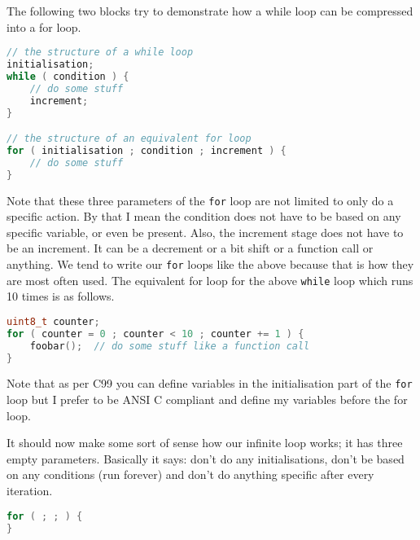 The following two blocks try to demonstrate how a while loop can be compressed into a for loop.

\begin{lstlisting}[language=c]
// the structure of a while loop
initialisation;
while ( condition ) {
    // do some stuff
    increment;
}

// the structure of an equivalent for loop
for ( initialisation ; condition ; increment ) {
    // do some stuff
}
\end{lstlisting}

Note that these three parameters of the \texttt{for} loop are not limited to only do a specific action. By that I mean the condition does not have to be based on any specific variable, or even be present. Also, the increment stage does not have to be an increment. It can be a decrement or a bit shift or a function call or anything.
We tend to write our \texttt{for} loops like the above because that is how they are most often used.
The equivalent for loop for the above \texttt{while} loop which runs 10 times is as follows.

\begin{lstlisting}[language=c]
uint8_t counter;
for ( counter = 0 ; counter < 10 ; counter += 1 ) {
    foobar();  // do some stuff like a function call
}
\end{lstlisting}

Note that as per C99 you can define variables in the initialisation part of the \texttt{for} loop but I prefer to be ANSI C compliant and define my variables before the for loop. 

It should now make some sort of sense how our infinite loop works; it has three empty parameters. Basically it says: don't do any initialisations, don't be based on any conditions (run forever) and don't do anything specific after every iteration. 

\begin{lstlisting}[language=c]
for ( ; ; ) {
}
\end{lstlisting}

